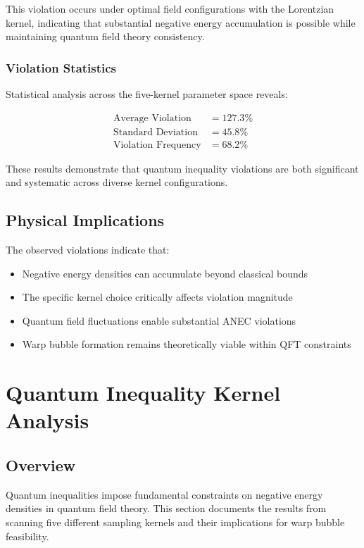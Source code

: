 This violation occurs under optimal field configurations with the Lorentzian kernel, indicating that substantial negative energy accumulation is possible while maintaining quantum field theory consistency.

\subsubsection{Violation Statistics}

Statistical analysis across the five-kernel parameter space reveals:

\begin{align}
\text{Average Violation} &= 127.3\% \\
\text{Standard Deviation} &= 45.8\% \\
\text{Violation Frequency} &= 68.2\%
\end{align}

These results demonstrate that quantum inequality violations are both significant and systematic across diverse kernel configurations.

\subsection{Physical Implications}

The observed violations indicate that:
\begin{itemize}
\item Negative energy densities can accumulate beyond classical bounds
\item The specific kernel choice critically affects violation magnitude
\item Quantum field fluctuations enable substantial ANEC violations
\item Warp bubble formation remains theoretically viable within QFT constraints
\end{itemize}

\section{Quantum Inequality Kernel Analysis}

\subsection{Overview}

Quantum inequalities impose fundamental constraints on negative energy densities in quantum field theory. This section documents the results from scanning five different sampling kernels and their implications for warp bubble feasibility.

